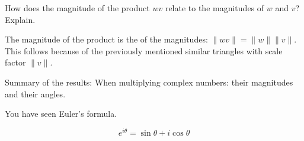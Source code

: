 \documentclass{ximera}
\begin{document}
\begin{question}
\begin{question}
\begin{question}
\begin{question}
How does the magnitude of the product $wv$ relate to the magnitudes of $w$ and $v$? Explain.
\begin{question}
The magnitude of the product is the  of the magnitudes:  $\| wv\|=\| w\| \| v\|$.  
This follows because of the previously mentioned similar triangles with scale factor $\| v\|$.  

Summary of the results:  When multiplying complex numbers:  
their magnitudes and  their angles.  
\end{question}

\end{question}
\end{question}
\end{question}

\end{question}

\begin{question}
You have seen Euler's formula.  

\[
e^{i\theta} = \sin\theta + i \cos\theta
\]

\end{question}
\end{document}
